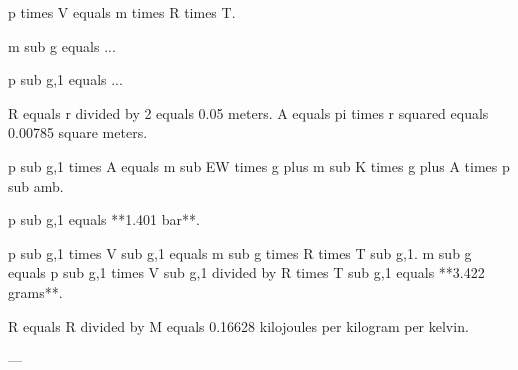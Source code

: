 p times V equals m times R times T.  

m sub g equals ...  

p sub g,1 equals ...  

R equals r divided by 2 equals 0.05 meters.  
A equals pi times r squared equals 0.00785 square meters.  

p sub g,1 times A equals m sub EW times g plus m sub K times g plus A times p sub amb.  

p sub g,1 equals **1.401 bar**.  

p sub g,1 times V sub g,1 equals m sub g times R times T sub g,1.  
m sub g equals p sub g,1 times V sub g,1 divided by R times T sub g,1 equals **3.422 grams**.  

R equals R divided by M equals 0.16628 kilojoules per kilogram per kelvin.  

---
